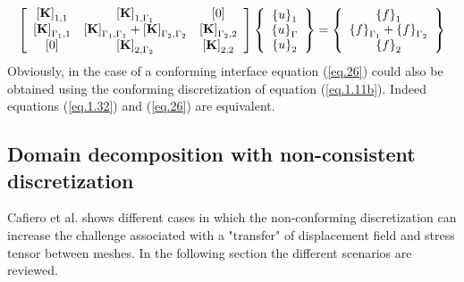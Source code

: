  \begin{equation}
 \label{eq.26}
     \left[ \begin{array}{ccc} 
     \left[{\mathbf{K}}\right]_{1,1} & \left[{\mathbf{K}}\right]_{1,\Gamma_1} & \left[{0}\right] \\
    \left[{\mathbf{K}}\right]_{\Gamma_1,1} & \left[{\mathbf{K}}\right]_{\Gamma_1,\Gamma_1}+ \left[{\mathbf{K}}\right]_{\Gamma_2,\Gamma_2} & \left[{\mathbf{K}}\right]_{\Gamma_2,2}\\   
     \left[{0}\right] & \left[{\mathbf{K}}\right]_{2,\Gamma_2} & \left[{\mathbf{K}}\right]_{2,2}\end{array} \right] \left\lbrace \begin{array}{c} \left\lbrace{u}\right \rbrace_1\\\left\lbrace{u}\right \rbrace_{\Gamma}\\\left\lbrace{u}\right \rbrace_2
     \end{array}\right\rbrace= \left\lbrace\begin{array}{c} \left\lbrace{f}\right \rbrace_1\\\left\lbrace{f}\right \rbrace_{\Gamma_1}+\left\lbrace{f}\right \rbrace_{\Gamma_2}\\\left\lbrace{f}\right \rbrace_2
     \end{array}\right\rbrace
 \end{equation}
 Obviously, in the case of a conforming interface equation (\ref{eq.26}) could also be obtained using the conforming discretization of equation (\ref{eq.1.11b}). Indeed equations (\ref{eq.1.32}) and (\ref{eq.26}) are equivalent.
 \subsection{Domain decomposition with non-consistent discretization}\label{ssec32}
 Cafiero et al.  \cite{cafiero2016domain} shows different cases in which the non-conforming discretization can increase the challenge associated with a "transfer" of displacement field and stress tensor between meshes.
 In the following section the different scenarios are reviewed.
 
